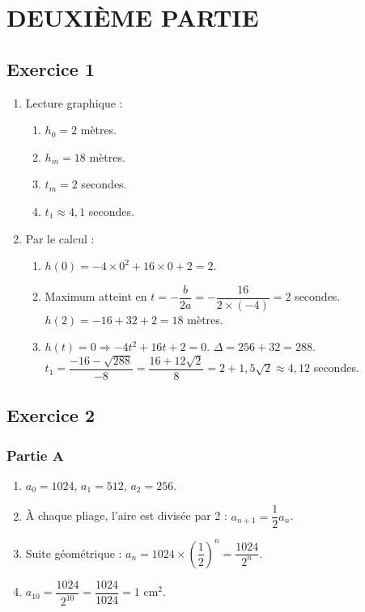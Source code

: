 \documentclass[a4paper,12pt]{article}
\begin{document}

\newpage

\section*{DEUXIÈME PARTIE}

\subsection*{Exercice 1}

\begin{enumerate}
\item Lecture graphique :
\begin{enumerate}
\item[a)] $h_0 = 2$ mètres.
\item[b)] $h_m = 18$ mètres.
\item[c)] $t_m = 2$ secondes.
\item[d)] $t_1 \approx 4,1$ secondes.
\end{enumerate}

\item Par le calcul :
\begin{enumerate}
\item[a)] $h(0) = -4 \times 0^2 + 16 \times 0 + 2 = 2$.
\item[b)] Maximum atteint en $t = -\dfrac{b}{2a} = -\dfrac{16}{2 \times (-4)} = 2$ secondes. $h(2) = -16 + 32 + 2 = 18$ mètres.
\item[c)] $h(t) = 0 \Rightarrow -4t^2 + 16t + 2 = 0$. $\Delta = 256 + 32 = 288$. $t_1 = \dfrac{-16 - \sqrt{288}}{-8} = \dfrac{16 + 12\sqrt{2}}{8} = 2 + 1,5\sqrt{2} \approx 4,12$ secondes.
\end{enumerate}
\end{enumerate}

\subsection*{Exercice 2}

\subsubsection*{Partie A}

\begin{enumerate}
\item $a_0 = 1024$, $a_1 = 512$, $a_2 = 256$.
\item À chaque pliage, l'aire est divisée par 2 : $a_{n+1} = \dfrac{1}{2} a_n$.
\item Suite géométrique : $a_n = 1024 \times \left(\dfrac{1}{2}\right)^n = \dfrac{1024}{2^n}$.
\item $a_{10} = \dfrac{1024}{2^{10}} = \dfrac{1024}{1024} = 1$ cm$^2$.
\end{enumerate}
\end{document}

